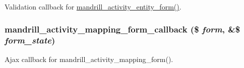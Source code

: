 \label{mandrill__activity_8admin_8inc_afb6aafdfef05226643d5a437488945db}
Validation callback for \hyperlink{mandrill__activity_8admin_8inc_a8cddf760b276121f239c2ef5022372d1}{mandrill\_\-activity\_\-entity\_\-form()}. \hypertarget{mandrill__activity_8admin_8inc_aae042db631ccc76e4d915e2fe7018aad}{
\subsubsection[{mandrill\_\-activity\_\-mapping\_\-form\_\-callback}]{\setlength{\rightskip}{0pt plus 5cm}mandrill\_\-activity\_\-mapping\_\-form\_\-callback (\$ {\em form}, \/  \&\$ {\em form\_\-state})}}
\label{mandrill__activity_8admin_8inc_aae042db631ccc76e4d915e2fe7018aad}
Ajax callback for mandrill\_\-activity\_\-mapping\_\-form(). 